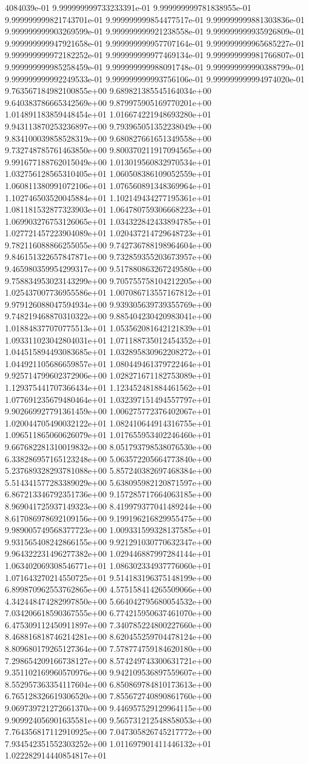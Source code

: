 4084039e-01	9.999999999733233391e-01	9.999999999781838955e-01	9.999999999821743701e-01	9.999999999854477517e-01	9.999999999881303836e-01	9.999999999903269599e-01	9.999999999921238558e-01	9.999999999935926809e-01	9.999999999947921658e-01	9.999999999957707164e-01	9.999999999965685227e-01	9.999999999972182252e-01	9.999999999977469134e-01	9.999999999981766807e-01	9.999999999985258459e-01	9.999999999988091748e-01	9.999999999990388799e-01	9.999999999992249533e-01	9.999999999993756106e-01	9.999999999994974020e-01
9.763567184982100855e+00	9.689821385545164034e+00	9.640383786665342569e+00	9.879975905169770201e+00	1.014891183859448454e+01	1.016674221948693280e+01	9.943113870253236897e+00	9.793965051352238049e+00	9.834100039858528319e+00	9.680827661651349558e+00	9.732748785761463850e+00	9.800370211917094565e+00	9.991677188762015049e+00	1.013019560832970534e+01	1.032756128565310405e+01	1.060508386109052559e+01	1.060811380991072106e+01	1.076560891348369964e+01	1.102746503520045884e+01	1.102149434277195361e+01	1.081181532877323903e+01	1.064780759306668223e+01	1.069903276753126065e+01	1.034322842433894785e+01	1.027721457223904089e+01	1.020437214729648723e+01	9.782116088866255055e+00	9.742736788198964604e+00	9.846151322657847871e+00	9.732859355203673957e+00	9.465980359954299317e+00	9.517880863267249580e+00	9.758834953023143299e+00	9.705755758104212205e+00	1.025437007736955586e+01	1.007086713557167812e+01	9.979126088047594934e+00	9.939305639739355769e+00	9.748219468870310322e+00	9.885404230420983041e+00	1.018848377070775513e+01	1.053562081642121839e+01	1.093311023042804031e+01	1.071188735012454352e+01	1.044515894493083685e+01	1.032895830962208272e+01	1.044921105686659857e+01	1.080449461379722464e+01	9.925714799602372906e+00	1.028271671182753089e+01	1.129375441707366434e+01	1.123452481884461562e+01	1.077691235679480464e+01	1.032397151494557797e+01	9.902669927791361459e+00	1.006275772376402067e+01	1.020044705490032122e+01	1.082410644914316755e+01	1.096511865060626079e+01	1.017655953402246460e+01	9.667682281310019832e+00	8.051793798538076530e+00	6.338286957165123248e+00	5.063572205664773840e+00	5.237689328293781088e+00	5.857240382697468384e+00	5.514341577283389029e+00	5.638095982120871597e+00	6.867213346792351736e+00	9.157285717664063185e+00	8.969041725937149323e+00	8.419979377041489244e+00	8.617086978692109156e+00	9.199196216829955475e+00	9.989005749568377723e+00	1.009331599328137585e+01	9.931565408242866155e+00	9.921291030770632347e+00	9.964322231496277382e+00	1.029446887997284144e+01	1.063402069308546771e+01	1.086302334937776060e+01	1.071643270214550725e+01	9.514183196375148199e+00	6.899870962553762865e+00	4.575158414265509066e+00	4.342448474282997850e+00	5.664042795680054532e+00	7.034206618590367555e+00	6.774215950637461070e+00	6.475309112450911897e+00	7.340785224800227660e+00	8.468816818746214281e+00	8.620455259704478124e+00	8.809680179265127364e+00	7.578774759184620180e+00	7.298654209166738127e+00	8.574249743300631721e+00	9.351102169960570976e+00	9.942109536897559607e+00	8.552957363354117604e+00	6.850869784810173613e+00	6.765128326619306520e+00	7.855672740890861760e+00	9.069739721272661370e+00	9.446957529129964115e+00	9.909924056901635581e+00	9.565731212548858053e+00	7.764356817112910925e+00	7.047305826745217772e+00	7.934542351552303252e+00	1.011697901411446132e+01	1.022282914440854817e+01